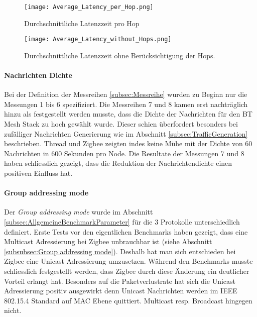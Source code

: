 \begin{figure}[!htbp]
\centering
\begin{minipage}[b]{0.49\textwidth}
		\centering
		\texttt{[image: Average\_Latency\_per\_Hop.png]}
		\caption{Durchschnittliche Latenzzeit pro Hop}
		\label{fig:DurchschnittlicheLatenzzeitValidierung}
\end{minipage}
\begin{minipage}[b]{0.49\textwidth}
		\centering
		\texttt{[image: Average\_Latency\_without\_Hops.png]}
		\caption{Durchschnittliche Latenzzeit ohne Berücksichtigung der Hops.}	\label{fig:DurchschnittlicheLatenzzeitohneHopsValidierung}
\end{minipage}
\end{figure}

\paragraph{Nachrichten Dichte}
Bei der Definition der Messreihen \ref{subsec:Messreihe} wurden zu Beginn nur die Messungen 1 bis 6 spezifiziert.
Die Messreihen 7 und 8 kamen erst nachträglich hinzu als festgestellt werden musste, dass die Dichte der Nachrichten für den BT Mesh Stack zu hoch gewählt wurde.
Dieser schien überfordert besonders bei zufälliger Nachrichten Generierung wie im Abschnitt \ref{subsec:TrafficGeneration} beschrieben.
Thread und Zigbee zeigten indes keine Mühe mit der Dichte von 60 Nachrichten in 600 Sekunden pro Node.
Die Resultate der Messungen 7 und 8 haben schliesslich gezeigt, dass die Reduktion der Nachrichtendichte einen positiven Einfluss hat.

\paragraph{Group addressing mode}
Der \textit{Group addressing mode} wurde im Abschnitt \ref{subsec:AllgemeineBenchmarkParameter} für die 3 Protokolle unterschiedlich definiert.
Erste Tests vor den eigentlichen Benchmarks haben gezeigt, dass eine Multicast Adressierung bei Zigbee unbrauchbar ist (siehe Abschnitt \ref{subsubsec:Group addressing mode}).
Deshalb hat man sich entschieden bei Zigbee eine Unicast Adressierung umzusetzen.
Während den Benchmarks musste schliesslich festgestellt werden, dass Zigbee durch diese Änderung ein deutlicher Vorteil erlangt hat.
Besonders auf die Paketverlustrate hat sich die Unicast Adressierung positiv ausgewirkt denn Unicast Nachrichten werden im IEEE 802.15.4 Standard auf MAC Ebene quittiert.
Multicast resp. Broadcast hingegen nicht.


